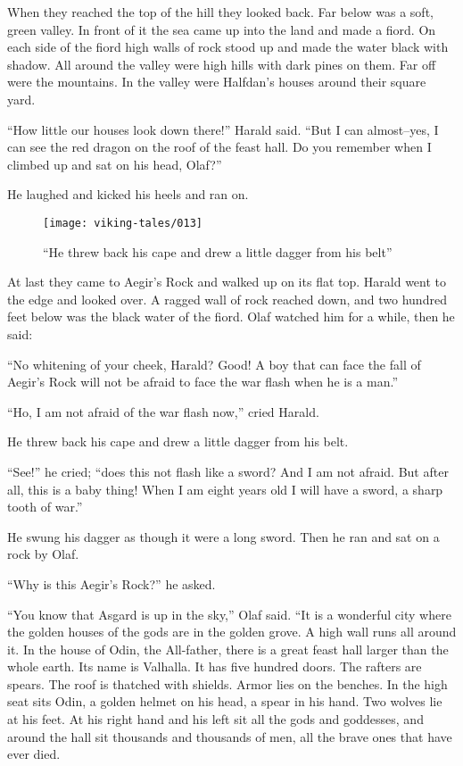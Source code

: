 When they reached the top of the hill they looked back. Far below was a
soft, green valley. In front of it the sea came up into the land and
made a fiord. On each side of the fiord high walls of rock stood up and
made the water black with shadow. All around the valley were high hills
with dark pines on them. Far off were the mountains. In the valley were
Halfdan's houses around their square yard.

``How little our houses look down there!'' Harald said. ``But I can
almost--yes, I can see the red dragon on the roof of the feast hall. Do
you remember when I climbed up and sat on his head, Olaf?''

He laughed and kicked his heels and ran on.

\begin{figure}
    \centering
    \texttt{[image: viking-tales/013]}
    \caption{
        ``He threw back his cape and drew a little dagger from his
        belt''}
\end{figure}

At last they came to Aegir's Rock and walked up on its flat top. Harald
went to the edge and looked over. A ragged wall of rock reached down,
and two hundred feet below was the black water of the fiord. Olaf
watched him for a while, then he said:

``No whitening of your cheek, Harald? Good! A boy that can face the fall
of Aegir's Rock will not be afraid to face the war flash when he is a
man.''

``Ho, I am not afraid of the war flash now,'' cried Harald.

He threw back his cape and drew a little dagger from his belt.

``See!'' he cried; ``does this not flash like a sword? And I am not
afraid. But after all, this is a baby thing! When I am eight years old I
will have a sword, a sharp tooth of war.''

He swung his dagger as though it were a long sword. Then he ran and sat
on a rock by Olaf.

``Why is this Aegir's Rock?'' he asked.

``You know that Asgard is up in the sky,'' Olaf said. ``It is a wonderful
city where the golden houses of the gods are in the golden grove. A high
wall runs all around it. In the house of Odin, the All-father, there is
a great feast hall larger than the whole earth. Its name is Valhalla. It
has five hundred doors. The rafters are spears. The roof is thatched
with shields. Armor lies on the benches. In the high seat sits Odin, a
golden helmet on his head, a spear in his hand. Two wolves lie at his
feet. At his right hand and his left sit all the gods and goddesses, and
around the hall sit thousands and thousands of men, all the brave ones
that have ever died.

